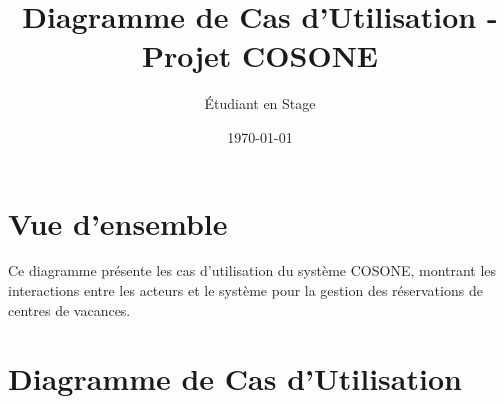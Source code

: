\documentclass[12pt,a4paper]{article}
\title{\textbf{Diagramme de Cas d'Utilisation - Projet COSONE}}
\author{Étudiant en Stage}
\date{\today}
\begin{document}
\maketitle

\section{Vue d'ensemble}

Ce diagramme présente les cas d'utilisation du système COSONE, montrant les interactions entre les acteurs et le système pour la gestion des réservations de centres de vacances.

\section{Diagramme de Cas d'Utilisation}
\end{document}
